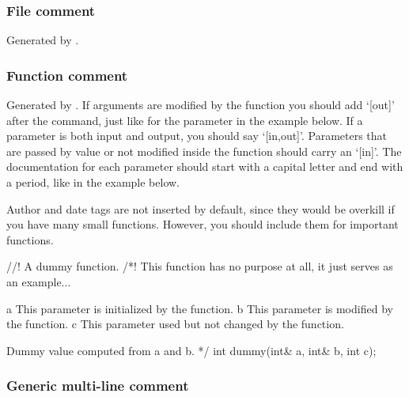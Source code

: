 \subsubsection{File comment}

Generated by .


\subsubsection{Function comment}

Generated by . If
arguments are modified by the function you should add `[out]' after
the  command, just like for the parameter
 in the example below. If a parameter is both input and
output, you should say `[in,out]'. Parameters that are passed by
value or not modified inside the function should carry an `[in]'. The
documentation for each parameter should start with a capital letter and
end with a period, like in the example below.

Author and date tags are not inserted by default, since they would be
overkill if you have many small functions. However, you should include
them for important functions. 

\begin{code}
  //! A dummy function.
  /*! 
  This function has no purpose at all,
  it just serves as an example... 

  \param[out]     a This parameter is initialized by the
  function.
  \param[in,out]  b This parameter is modified by the function.
  \param[in]      c This parameter used but not changed by the function.

  \return   Dummy value computed from a and b.         
  */
  int dummy(int& a, int& b, int c);
\end{code}

\subsubsection{Generic multi-line comment}

